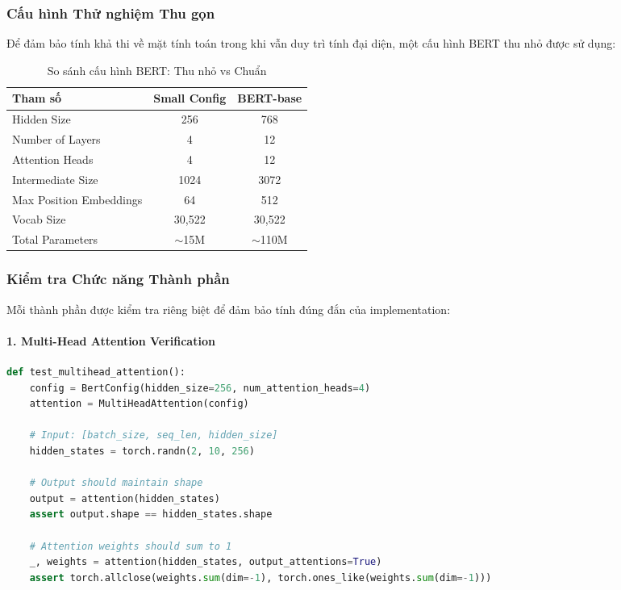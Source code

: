 \subsubsection{Cấu hình Thử nghiệm Thu gọn}
Để đảm bảo tính khả thi về mặt tính toán trong khi vẫn duy trì tính đại diện, một cấu hình BERT thu nhỏ được sử dụng:

\begin{table}[H]
\centering
\caption{So sánh cấu hình BERT: Thu nhỏ vs Chuẩn}
\label{tab:bert_config_comparison}
\begin{tabular}{lcc}
\toprule
\textbf{Tham số} & \textbf{Small Config} & \textbf{BERT-base} \\
\midrule
Hidden Size & 256 & 768 \\
Number of Layers & 4 & 12 \\
Attention Heads & 4 & 12 \\
Intermediate Size & 1024 & 3072 \\
Max Position Embeddings & 64 & 512 \\
Vocab Size & 30,522 & 30,522 \\
Total Parameters & $\sim$15M & $\sim$110M \\
\bottomrule
\end{tabular}
\end{table}

\subsubsection{Kiểm tra Chức năng Thành phần}

Mỗi thành phần được kiểm tra riêng biệt để đảm bảo tính đúng đắn của implementation:

\paragraph{1. Multi-Head Attention Verification}
\newline
\begin{lstlisting}[language=Python, caption=Kiểm tra Multi-Head Attention]
def test_multihead_attention():
    config = BertConfig(hidden_size=256, num_attention_heads=4)
    attention = MultiHeadAttention(config)
    
    # Input: [batch_size, seq_len, hidden_size]
    hidden_states = torch.randn(2, 10, 256)
    
    # Output should maintain shape
    output = attention(hidden_states)
    assert output.shape == hidden_states.shape
    
    # Attention weights should sum to 1
    _, weights = attention(hidden_states, output_attentions=True)
    assert torch.allclose(weights.sum(dim=-1), torch.ones_like(weights.sum(dim=-1)))
\end{lstlisting}

